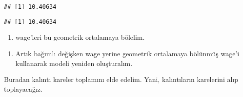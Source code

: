 \documentclass[
]{book}
\newenvironment{Shaded}{\begin{snugshade}}{\end{snugshade}}
\newcommand{\CommentTok}[1]{\textcolor[rgb]{0.56,0.35,0.01}{\textit{#1}}}
\newcommand{\DataTypeTok}[1]{\textcolor[rgb]{0.13,0.29,0.53}{#1}}
\newcommand{\DecValTok}[1]{\textcolor[rgb]{0.00,0.00,0.81}{#1}}
\newcommand{\KeywordTok}[1]{\textcolor[rgb]{0.13,0.29,0.53}{\textbf{#1}}}
\newcommand{\NormalTok}[1]{#1}
\newcommand{\OperatorTok}[1]{\textcolor[rgb]{0.81,0.36,0.00}{\textbf{#1}}}
\newcommand{\StringTok}[1]{\textcolor[rgb]{0.31,0.60,0.02}{#1}}
\providecommand{\tightlist}{%
  \setlength{\itemsep}{0pt}\setlength{\parskip}{0pt}}
\begin{document}
\begin{verbatim}
## [1] 10.40634
\end{verbatim}

\begin{Shaded}
\end{Shaded}

\begin{verbatim}
## [1] 10.40634
\end{verbatim}

\begin{enumerate}
\def\labelenumi{\roman{enumi}.}
\setcounter{enumi}{1}
\tightlist
\item
  wage'leri bu geometrik ortalamaya bölelim.
\end{enumerate}

\begin{Shaded}
\end{Shaded}

\begin{enumerate}
\def\labelenumi{\roman{enumi}.}
\setcounter{enumi}{2}
\tightlist
\item
  Artık bağımlı değişken wage yerine geometrik ortalamaya bölünmüş wage'i kullanarak modeli yeniden oluşturalım.
\end{enumerate}

\begin{Shaded}
\end{Shaded}

Buradan kalıntı kareler toplamını elde edelim. Yani, kalıntıların karelerini alıp toplayacağız.
\end{document}
